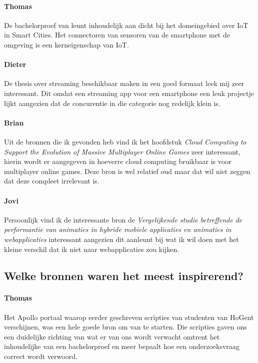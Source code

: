 \documentclass[fleqn,10pt]{voorstel}
\begin{document}
\paragraph{Thomas}De bachelorproef van \cite{VanderPlaetsen2013} leunt inhoudelijk aan dicht bij het domeingebied over IoT in Smart Cities. Het connectoren van sensoren van de smartphone met de omgeving is een kerneigenschap van IoT.

\paragraph{Dieter}De thesis \cite{CosmanAlexander2011} over streaming beschikbaar maken in een goed formaat leek mij zeer interessant. Dit omdat een streaming app voor een smartphone een leuk projectje lijkt aangezien dat de concurentie in die categorie nog redelijk klein is.

\paragraph{Brian}Uit de bronnen die ik gevonden heb vind ik het hoofdstuk \textit{Cloud Computing to Support the Evolution of Massive Multiplayer Online Games} \citep{Maggiorini2011} zeer interessant, hierin wordt er aangegeven in hoeverre cloud computing bruikbaar is voor multiplayer online games. Deze bron is wel relatief oud maar dat wil niet zeggen dat deze compleet irrelevant is.

\paragraph{Jovi}Persoonlijk vind ik de interessante bron de \textit{Vergelijkende studie betreffende de performantie van animaties in hybride mobiele applicaties en animaties in webapplicaties} \citep{Devos2015} interessant aangezien dit aanleunt bij wat ik wil doen met het kleine verschil dat ik niet naar webapplicaties zou kijken.

\subsection{Welke bronnen waren het meest inspirerend?}

\paragraph{Thomas} Het Apollo portaal waarop eerder geschreven scripties van studenten van HoGent verschijnen, was een hele goede bron om van te starten. Die scripties gaven ons een duidelijke richting van wat er van ons wordt verwacht omtrent het inhoudelijke van een bachelorproef en meer bepaalt hoe een onderzoeksvraag correct wordt verwoord. 
\end{document}
